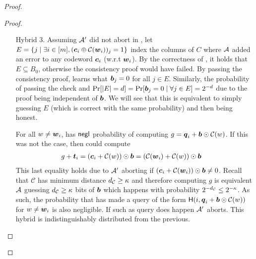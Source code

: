 \begin{proof}
\begin{proof}
\begin{enumerate}[leftmargin=0.6cm,itemindent=30pt]
			
			\item[Hybrid 3.]\label{hybrid:simOutput} Assuming $\mathcal{A}'$ did not abort in , let $E=\{j \mid \exists i\in[m], (\boldsymbol{c}_i\oplus \mathcal{C}(\boldsymbol{w}_i))_j = 1\}$ index the columns of $C$ where $\mathcal{A}$ added an error to any codeword $\boldsymbol{c}_i$ (w.r.t $\boldsymbol{w}_i$). By the correctness of , it holds that $E\subseteq B_0$, otherwise the consistency proof would have failed.
			\iffullversion
			 By passing the consistency proof, \Adv learns what $\boldsymbol{b}_j=0$ for all $j\in E$. Similarly, the probability of passing the check and $\Pr[|E|=d]=\Pr[\boldsymbol{b}_j=0 \mid \forall j\in E]=2^{-d}$ due to the proof being independent of $\boldsymbol{b}$. We will see that this is equivalent to \Adv simply guessing $E$ (which is correct with the same probability) and then being honest. 
			\fi
			
			For all $w\neq \boldsymbol{w}_i$, \Adv  has $\mathsf{negl}$ probability of computing $g=\boldsymbol{q}_i+\boldsymbol{b}\odot \mathcal{C}(w)$. If this was not the case, then \Adv  could compute
			\begin{align*}
			g +\boldsymbol{t}_i &=(\boldsymbol{c}_i+\mathcal{C}(w))\odot \boldsymbol{b}=(\mathcal{C}(\boldsymbol{w}_i)+\mathcal{C}(w))\odot \boldsymbol{b}
			\end{align*}
			This last equality holds due to $\mathcal{A}'$ aborting if $(\boldsymbol{c}_i+\mathcal{C}(\boldsymbol{w}_i))\odot \boldsymbol{b}\neq 0$. Recall that $\mathcal{C}$ has minimum distance ${d_\mathcal{C}}\geq \kappa$ and therefore computing $g$ is equivalent $\mathcal{A}$ guessing ${d_\mathcal{C}}\geq \kappa$ bits of $\boldsymbol{b}$ which happens with probability $2^{-{d_\mathcal{C}}}\leq 2^{-\kappa}$.  As such, the probability that \Adv has made a query of the form $\mathsf{H}(i,\boldsymbol{q}_i+\boldsymbol{b}\odot \mathcal{C}(w))$ for $w\neq \boldsymbol{w}_i$ is also negligible.
			\iffullversion
			 If such as query does happen $\mathcal{A}'$ aborts. This hybrid is indistinguishably distributed from the previous. 
			\fi
			

\end{enumerate}
\end{proof}
\end{proof}
